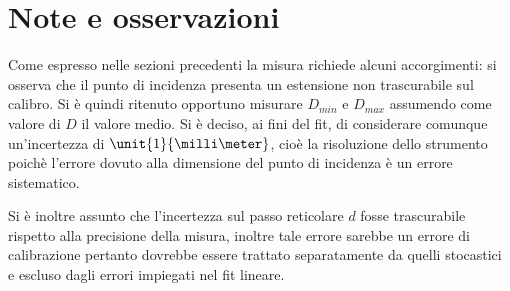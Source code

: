 \section{Note e osservazioni}
Come espresso nelle sezioni precedenti la misura richiede alcuni accorgimenti:
si osserva che il punto di incidenza 
presenta un estensione non trascurabile sul calibro.
Si è quindi ritenuto opportuno misurare $D_{min}$ e $ D_{max}$
assumendo come valore di $D$ il valore medio. Si è deciso, ai fini del fit, di considerare comunque un'incertezza di $\unit{1}{\milli\meter}$, cioè la risoluzione dello strumento poichè l'errore dovuto alla dimensione del punto di incidenza è un errore sistematico.

Si è inoltre assunto che l'incertezza sul passo
reticolare $d$ fosse trascurabile rispetto alla precisione della misura, inoltre tale errore sarebbe un errore di calibrazione pertanto dovrebbe essere trattato separatamente da quelli stocastici e 
escluso dagli errori impiegati nel fit lineare.